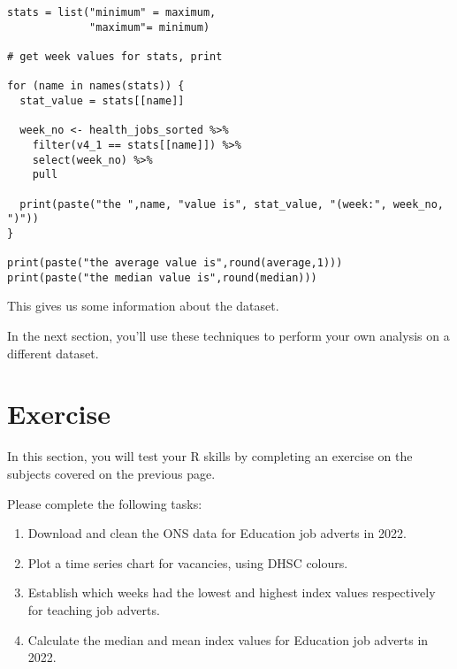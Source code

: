 \documentclass[
]{book}
\begin{document}
\begin{verbatim}
stats = list("minimum" = maximum,
             "maximum"= minimum)

# get week values for stats, print

for (name in names(stats)) {
  stat_value = stats[[name]]

  week_no <- health_jobs_sorted %>%
    filter(v4_1 == stats[[name]]) %>%
    select(week_no) %>%
    pull

  print(paste("the ",name, "value is", stat_value, "(week:", week_no, ")"))
}

print(paste("the average value is",round(average,1)))
print(paste("the median value is",round(median)))
\end{verbatim}

This gives us some information about the dataset.

In the next section, you'll use these techniques to perform your own analysis on a different dataset.

\hypertarget{exercise}{%
\chapter{Exercise}\label{exercise}}

In this section, you will test your R skills by completing an exercise on the subjects covered on the previous page.

Please complete the following tasks:

\begin{enumerate}
\def\labelenumi{\arabic{enumi}.}
\item
  Download and clean the ONS data for Education job adverts in 2022.
\item
  Plot a time series chart for vacancies, using DHSC colours.
\item
  Establish which weeks had the lowest and highest index values respectively for teaching job adverts.
\item
  Calculate the median and mean index values for Education job adverts in 2022.
\end{enumerate}

  
\end{document}
